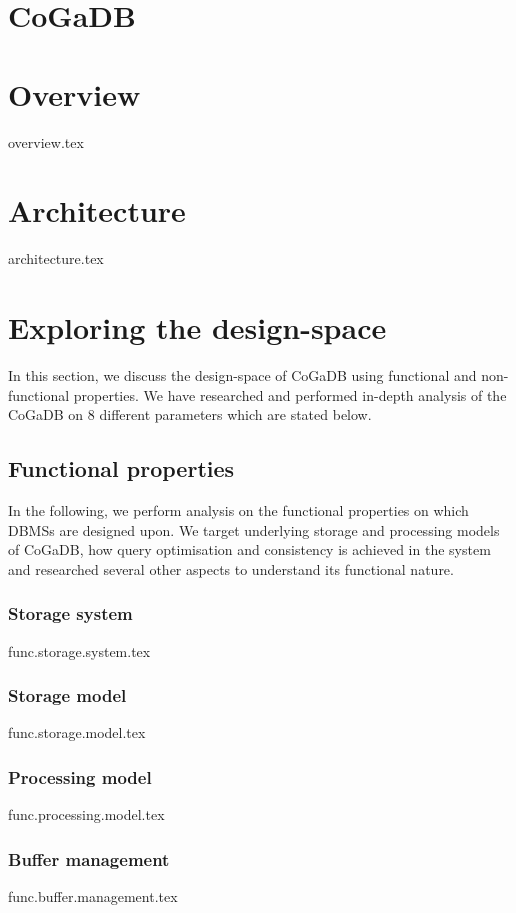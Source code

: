 \documentclass[a4paper, 11pt]{article}
\begin{document}
\section*{CoGaDB}
\section*{Overview}
{overview.tex}

\section*{Architecture}
{architecture.tex}

\section*{Exploring the design-space}
In this section, we discuss the design-space of CoGaDB using functional and non-functional properties. We have researched and performed in-depth analysis of the CoGaDB on 8 different parameters which are stated below.

\subsection*{Functional properties}
In the following, we perform analysis on the functional properties on which DBMSs are designed upon. We target underlying storage and processing models of CoGaDB, how query optimisation and consistency is achieved in the system and researched several other aspects to understand its functional nature.

\subsubsection*{Storage system}
{func.storage.system.tex}

\subsubsection*{Storage model}
{func.storage.model.tex}

\subsubsection*{Processing model}
{func.processing.model.tex}

\subsubsection*{Buffer management}
{func.buffer.management.tex}
\end{document}
